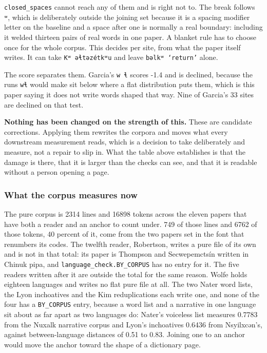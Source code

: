 \texttt{closed\_\allowbreak{}spaces} cannot reach any of them and is right not to. The break follows \texttt{ʷ}, which is deliberately outside the joining set because it is a spacing modifier letter on the baseline and a space after one is normally a real boundary: including it welded thirteen pairs of real words in one paper. A blanket rule has to choose once for the whole corpus. This decides per site, from what the paper itself writes. It can take \texttt{Kʷ əɬtəzétkʷu} and leave \texttt{bəlkʷ ‘return’} alone.

The score separates them. Garcia's \texttt{w ɬ} scores -1.4 and is declined, because the runs \texttt{wɬ} would make sit below where a flat distribution puts them, which is this paper saying it does not write words shaped that way. Nine of Garcia's 33 sites are declined on that test.

\textbf{Nothing has been changed on the strength of this.} These are candidate corrections. Applying them rewrites the corpora and moves what every downstream measurement reads, which is a decision to take deliberately and measure, not a repair to slip in. What the table above establishes is that the damage is there, that it is larger than the checks can see, and that it is readable without a person opening a page.

\subsubsection{What the corpus measures now}

The pure corpus is 2314 lines and 16898 tokens across the eleven papers that have both a reader and an anchor to count under. 749 of those lines and 6762 of those tokens, 40 percent of it, come from the two papers set in the font that renumbers its codes. The twelfth reader, Robertson, writes a pure file of its own and is not in that total: its paper is Thompson and Secwepemctsín written in Chinuk pipa, and \texttt{language\_\allowbreak{}check.\allowbreak{}BY\_\allowbreak{}CORPUS} has no entry for it. The five readers written after it are outside the total for the same reason. Wolfe holds eighteen languages and writes no flat pure file at all. The two Nater word lists, the Lyon inchoatives and the Kim reduplications each write one, and none of the four has a \texttt{BY\_\allowbreak{}CORPUS} entry, because a word list and a narrative in one language sit about as far apart as two languages do: Nater's voiceless list measures 0.7783 from the Nuxalk narrative corpus and Lyon's inchoatives 0.6436 from Nsyilxcən's, against between-language distances of 0.51 to 0.83. Joining one to an anchor would move the anchor toward the shape of a dictionary page.

